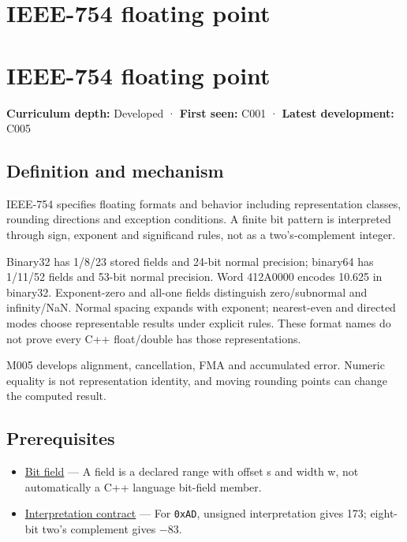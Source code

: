 \hypertarget{appendix-343615f49ddf}{}
\section*{IEEE-754 floating point}
\section{IEEE-754 floating point}\label{ieee-754-floating-point}

\textbf{Curriculum depth:} Developed · \textbf{First seen:} C001 · \textbf{Latest development:} C005

\subsection{Definition and mechanism}\label{definition-and-mechanism}

IEEE-754 specifies floating formats and behavior including representation classes, rounding directions and exception conditions. A finite bit pattern is interpreted through sign, exponent and significand rules, not as a two's-complement integer.

Binary32 has 1/8/23 stored fields and 24-bit normal precision; binary64 has 1/11/52 fields and 53-bit normal precision. Word 412A0000 encodes 10.625 in binary32. Exponent-zero and all-one fields distinguish zero/subnormal and infinity/NaN. Normal spacing expands with exponent; nearest-even and directed modes choose representable results under explicit rules. These format names do not prove every C++ float/double has those representations.

M005 develops alignment, cancellation, FMA and accumulated error. Numeric equality is not representation identity, and moving rounding points can change the computed result.

\subsection{Prerequisites}\label{prerequisites}

\begin{itemize}
\tightlist
\item
  \hyperref[appendix-ac697f5c66e8]{Bit field} --- A field is a declared range with offset s and width w, not automatically a C++ language bit-field member.
\item
  \hyperref[appendix-f414bd4ed05c]{Interpretation contract} --- For \texttt{0xAD}, unsigned interpretation gives 173; eight-bit two's complement gives −83.
\end{itemize}

